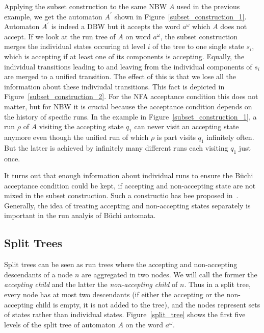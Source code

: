 Applying the subset construction to the same NBW $A$ used in the previous example, we get the automaton $A^\prime$ shown in Figure~\ref{subset_construction_1}. Automaton $A^\prime$ is indeed a DBW but it accepts the word $a^\omega$ which $A$ does not accept. If we look at the run tree of $A$ on word $a^\omega$, the subset construction merges the individual states occuring at level $i$ of the tree to one single state $s_i$, which is accepting if at least one of its components is accepting. Equally, the individual transitions leading to and leaving from the individual components of $s_i$ are merged to a unified transition. The effect of this is that we lose all the information about these indiviudal transitions. This fact is depicted in Figure~\ref{subset_construction_2}. For the NFA acceptance condition this does not matter, but for NBW it is crucial because the acceptance condition depends on the history of specific runs. In the example in Figure~\ref{subset_construction_1}, a run $\rho$ of $A$ visiting the accepting state $q_1$ can never visit an accepting state anymore even though the unified run of which $\rho$ is part visits $q_1$ infinitely often. But the latter is achieved by infinitely many different runs each visiting $q_1$ just once.

It turns out that enough information about individual runs to ensure the Büchi acceptance condition could be kept, if accepting and non-accepting state are not mixed in the subset construction. Such a constructio has bee proposed in~\cite{UltesNitsche2007107}. Generally, the idea of treating accepting and non-accepting states separately is important in the run analyis of Büchi automata.





\subsection{Split Trees}
Split trees can be seen as run trees where the accepting and non-accepting descendants of a node $n$ are aggregated in two nodes. We will call the former the \emph{accepting child} and the latter the \emph{non-accepting child} of $n$. Thus in a split tree, every node has at most two descendants (if either the accepting or the non-accepting child is empty, it is not added to the tree), and the nodes represent sets of states rather than individual states. Figure~\ref{split_tree} shows the first five levels of the split tree of automaton $A$ on the word $a^\omega$.

